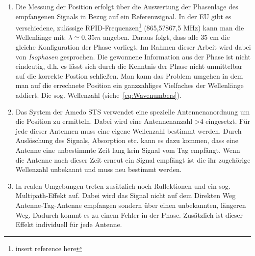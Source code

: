 \begin{enumerate}
	\item Die Messung der Position erfolgt über die Auswertung der Phasenlage des empfangenen Signals in Bezug auf ein Referenzsignal. In der EU gibt es verschiedene, zulässige RFID-Frequenzen\footnote{insert reference here} (865,5?867,5 MHz) kann man die Wellenlänge mit: $ \lambda\simeq0,35 m $ angeben. Daraus folgt, dass alle 35 cm die gleiche Konfiguration der Phase vorliegt. Im Rahmen dieser Arbeit wird dabei von \textit{Isophasen} gesprochen. Die gewonnene Information aus der Phase ist nicht eindeutig, d.h. es lässt sich durch die Kenntnis der Phase nicht unmittelbar auf die korrekte Postion schließen. Man kann das Problem umgehen in dem man auf die errechnete Position ein ganzzahliges Vielfaches der Wellenlänge addiert. Die sog. Wellenzahl (siehe~\eqref{eq:Wavenumbers}).
	\item Das System der Amedo STS verwendet eine spezielle Antennenanordnung um die Position zu ermitteln. Dabei wird eine Antennenanzahl >4 eingesetzt. Für jede dieser Antennen muss eine eigene Wellenzahl bestimmt werden. Durch Auslöschung des Signals, Absorption etc. kann es dazu kommen, dass eine Antenne eine unbestimmte Zeit lang kein Signal vom Tag empfängt. Wenn die Antenne nach dieser Zeit erneut ein Signal empfängt ist die ihr zugehörige Wellenzahl unbekannt und muss neu bestimmt werden. 
	\item In realen Umgebungen treten zusätzlich noch Ruflektionen und ein sog. Multipath-Effekt auf. Dabei wird das Signal nicht auf dem Direkten Weg Antenne-Tag-Antenne empfangen sondern über einen unbekannten, längeren Weg. Dadurch kommt es zu einem Fehler in der Phase. Zusätzlich ist dieser Effekt individuell für jede Antenne.
\end{enumerate}

%